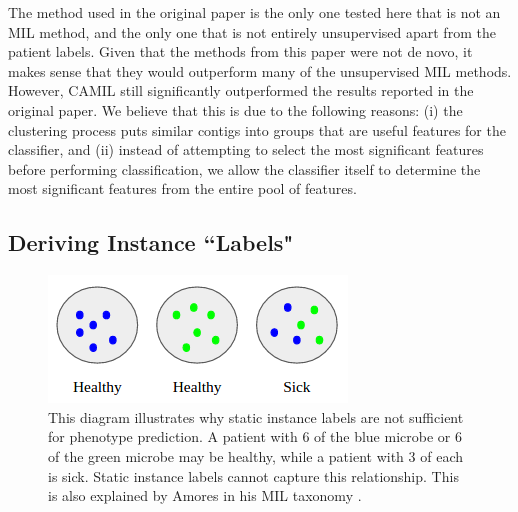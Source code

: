 The method used in the original paper is the only one tested here that is not an MIL method, and the only one that is not entirely unsupervised apart from the patient labels. Given that the methods from this paper were not de novo, it makes sense that they would outperform many of the unsupervised MIL methods. However, CAMIL still significantly outperformed the results reported in the original paper. We believe that this is due to the following reasons: (i) the clustering process puts similar contigs into groups that are useful features for the classifier, and (ii) instead of attempting to select the most significant features before performing classification, we allow the classifier itself to determine the most significant features from the entire pool of features.

\subsection{Deriving Instance ``Labels"}

\begin{figure}[t]
\centering
\includegraphics[scale=0.5]{./instance-labels.png}
\caption{This diagram illustrates why static instance labels are not sufficient for phenotype prediction. A patient with 6 of the blue microbe or 6 of the green microbe may be healthy, while a patient with 3 of each is sick. Static instance labels cannot capture this relationship. This is also explained by Amores in his MIL taxonomy \cite{amores13}.} \label{instance-labels}
\end{figure}

